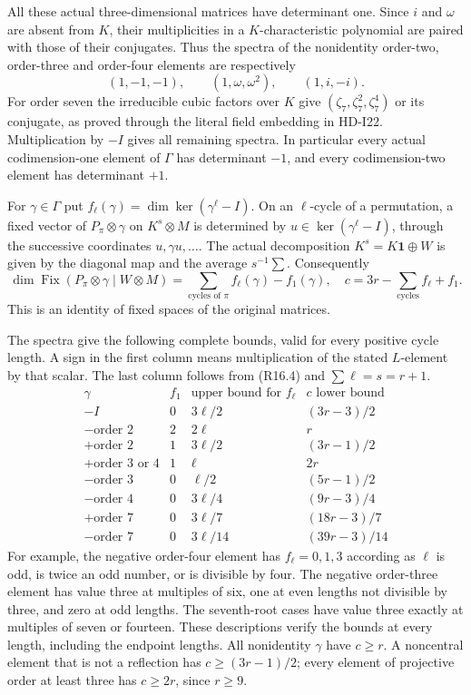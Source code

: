 All these actual three-dimensional matrices have determinant
one. Since \(i\) and \(\omega\) are absent from \(K\),
their multiplicities in a \(K\)-characteristic polynomial
are paired with those of their conjugates. Thus the spectra
of the nonidentity order-two, order-three and order-four
elements are respectively
\[
 (1,-1,-1),\qquad (1,\omega,\omega^2),\qquad(1,i,-i).
                                                               \tag{R16.3}
\]
For order seven the irreducible cubic factors over \(K\)
give \((\zeta_7,\zeta_7^2,\zeta_7^4)\) or its conjugate,
as proved through the literal field embedding in HD-I22.
Multiplication by \(-I\) gives all remaining spectra.
In particular every actual codimension-one element of
\(\Gamma\) has determinant \(-1\), and every
codimension-two element has determinant \(+1\).

For \(\gamma\in\Gamma\) put
\(f_\ell(\gamma)=\dim\ker(\gamma^\ell-I)\).
On an \(\ell\)-cycle of a permutation, a fixed vector
of \(P_\pi\otimes\gamma\) on \(K^s\otimes M\) is
determined by \(u\in\ker(\gamma^\ell-I)\), through
the successive coordinates \(u,\gamma u,\ldots\).
The actual decomposition
\(K^s=K\boldsymbol1\oplus W\) is given by the diagonal
map and the average \(s^{-1}\sum\). Consequently
\[
 \dim\operatorname{Fix}(P_\pi\otimes\gamma\mid W\otimes M)
       =\sum_{\text{cycles of }\pi}f_\ell(\gamma)-f_1(\gamma),
 \quad c=3r-\sum_{\text{cycles}}f_\ell+f_1.             \tag{R16.4}
\]
This is an identity of fixed spaces of the original matrices.

The spectra give the following complete bounds, valid for
every positive cycle length. A sign in the first column
means multiplication of the stated \(L\)-element by that
scalar. The last column follows from (R16.4) and
\(\sum\ell=s=r+1\).
\[
\begin{array}{c|c|c|c}
 \gamma&f_1&\text{upper bound for }f_\ell&c\text{ lower bound}\\\hline
 -I&0&3\ell/2&(3r-3)/2\\
 -\text{order }2&2&2\ell&r\\
 +\text{order }2&1&3\ell/2&(3r-1)/2\\
 +\text{order }3\text{ or }4&1&\ell&2r\\
 -\text{order }3&0&\ell/2&(5r-1)/2\\
 -\text{order }4&0&3\ell/4&(9r-3)/4\\
 +\text{order }7&0&3\ell/7&(18r-3)/7\\
 -\text{order }7&0&3\ell/14&(39r-3)/14
\end{array}                                                   \tag{R16.5}
\]
For example, the negative order-four element has
\(f_\ell=0,1,3\) according as \(\ell\) is odd,
is twice an odd number, or is divisible by four. The
negative order-three element has value three at multiples
of six, one at even lengths not divisible by three, and
zero at odd lengths. The seventh-root cases have value
three exactly at multiples of seven or fourteen. These
descriptions verify the bounds at every length, including
the endpoint lengths. All nonidentity \(\gamma\) have
\(c\ge r\). A noncentral element that is not a reflection
has \(c\ge(3r-1)/2\); every element of projective order
at least three has \(c\ge2r\), since \(r\ge9\).

